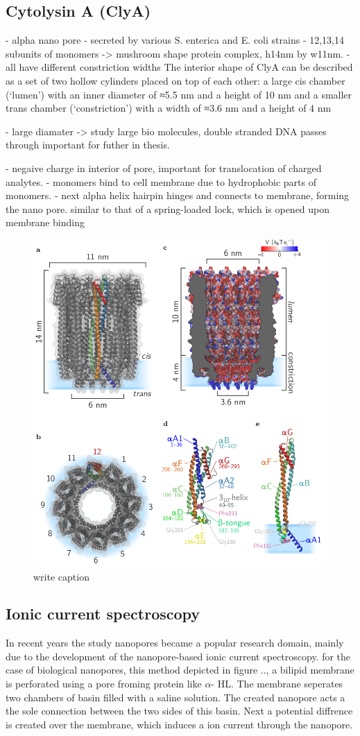 \subsection{Cytolysin A (ClyA)}

- alpha nano pore
- secreted by various S. enterica and E. coli strains
- 12,13,14 subunits of monomers ->  mushroom shape protein complex, h14nm by w11nm.
- all have different constriction widths
The interior shape of ClyA can be described
as a set of two hollow cylinders placed on top of each other: a large cis chamber
(‘lumen’) with an inner diameter of ≈5.5 nm and a height of 10 nm and a smaller
trans chamber (‘constriction’) with a width of ≈3.6 nm and a height of 4 nm

- large diamater -> study large bio molecules, double stranded DNA passes through
important for futher in thesis.

- negaive charge in interior of pore, important for translocation of charged analytes.
- monomers bind to cell membrane  due to hydrophobic parts of monomers.
- next alpha helix hairpin hinges and connects to membrane, forming the nano pore.
similar to that of a spring-loaded lock, which is opened upon membrane binding


\begin{figure}[h!]
  \centering
  \includegraphics[width=0.5\linewidth]{Figures/cytolysinA.png}
  \caption{write caption}
  \label{adassf}
\end{figure}

\subsection{Ionic current spectroscopy}
In recent years the study nanopores became a popular research domain, mainly
due to the development of the nanopore-based ionic current spectroscopy. for the case of
biological nanopores, this method depicted in figure .., a bilipid membrane is perforated
using a pore froming protein like $\alpha$- HL. The membrane seperates two chambers of
basin filled with a saline solution. The created nanopore acts a the sole connection
between the two sides of this basin. Next a potential diffrence is created over the
membrane, which induces a ion current through the nanopore.

